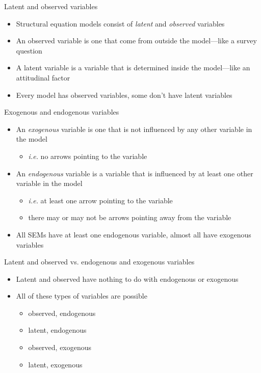 \begin{frame}{Latent and observed variables}
  \begin{itemize}
    \item Structural equation models consist of \emph{latent} and \emph{observed} variables
    \item An observed variable is one that come from outside the model---like a survey question
    \item A latent variable is a variable that is determined inside the model---like an attitudinal factor
    \item Every model has observed variables, some don't have latent variables
  \end{itemize}
\end{frame}

\begin{frame}{Exogenous and endogenous variables}
  \begin{itemize}
    \item An \emph{exogenous} variable is one that is not influenced by any other variable in the model
    \begin{itemize}
      \item \textit{i.e.} no arrows pointing to the variable
    \end{itemize}
    \item An \emph{endogenous} variable is a variable that is influenced by at least one other variable in the model
    \begin{itemize}
      \item \textit{i.e.} at least one arrow pointing to the variable
      \item there may or may not be arrows pointing away from the variable
    \end{itemize}
    \item All SEMs have at least one endogenous variable, almost all have exogenous variables
  \end{itemize}
\end{frame}

\begin{frame}{Latent and observed vs. endogenous and exogenous variables}
  \begin{itemize}
    \item Latent and observed have nothing to do with endogenous or exogenous
    \item All of these types of variables are possible
    \begin{itemize}
      \item observed, endogenous
      \item latent, endogenous
      \item observed, exogenous
      \item latent, exogenous
    \end{itemize}
  \end{itemize}
\end{frame}

